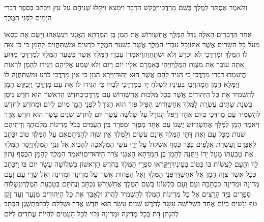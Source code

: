 \documentclass[../main/main.tex]{subfiles}
\begin{document}
\begin{multicols*}{\ncols}
וַתֹּאמֶר אֶסְתֵּר לַמֶּלֶךְ בְּשֵׁם מָרְדֳּכָי\PreVerseSpace{}וַיְבֻקַּשׁ הַדָּבָר וַיִּמָּצֵא וַיִּתָּלוּ שְׁנֵיהֶם עַל עֵץ וַיִּכָּתֵב בְּסֵפֶר דִּבְרֵי הַיָּמִים לִפְנֵי הַמֶּלֶךְ\OpenSection{}\par
{}אַחַר הַדְּבָרִים הָאֵלֶּה גִּדַּל הַמֶּלֶךְ אֲחַשְׁוֵרוֹשׁ אֶת הָמָן בֶּן הַמְּדָתָא הָאֲגָגִי וַיְנַשְּׂאֵהוּ וַיָּשֶׂם אֶת כִּסְאוֹ מֵעַל כָּל הַשָּׂרִים אֲשֶׁר אִתּוֹ\PreVerseSpace{}וְכָל עַבְדֵי הַמֶּלֶךְ אֲשֶׁר בְּשַׁעַר הַמֶּלֶךְ כֹּרְעִים וּמִשְׁתַּחֲוִים לְהָמָן כִּי כֵן צִוָּה לוֹ הַמֶּלֶךְ וּמָרְדֳּכַי לֹא יִכְרַע וְלֹא יִשְׁתַּחֲוֶה\PreVerseSpace{}וַיֹּאמְרוּ עַבְדֵי הַמֶּלֶךְ אֲשֶׁר בְּשַׁעַר הַמֶּלֶךְ לְמָרְדֳּכָי מַדּוּעַ אַתָּה עוֹבֵר אֵת מִצְוַת הַמֶּלֶךְ\PreVerseSpace{}וַיְהִי בְּאָמְרָם אֵלָיו יוֹם וָיוֹם וְלֹא שָׁמַע אֲלֵיהֶם וַיַּגִּידוּ לְהָמָן לִרְאוֹת הֲיַעַמְדוּ דִּבְרֵי מָרְדֳּכַי כִּי הִגִּיד לָהֶם אֲשֶׁר הוּא יְהוּדִי\PreVerseSpace{}וַיַּרְא הָמָן כִּי אֵין מָרְדֳּכַי כֹּרֵעַ וּמִשְׁתַּחֲוֶה לוֹ וַיִּמָּלֵא הָמָן חֵמָה\PreVerseSpace{}וַיִּבֶז בְּעֵינָיו לִשְׁלֹחַ יָד בְּמָרְדֳּכַי לְבַדּוֹ כִּי הִגִּידוּ לוֹ אֶת עַם מָרְדֳּכָי וַיְבַקֵּשׁ הָמָן לְהַשְׁמִיד אֶת כָּל הַיְּהוּדִים אֲשֶׁר בְּכָל מַלְכוּת אֲחַשְׁוֵרוֹשׁ עַם מָרְדֳּכָי\PreVerseSpace{}בַּחֹדֶשׁ הָרִאשׁוֹן הוּא חֹדֶשׁ נִיסָן בִּשְׁנַת שְׁתֵּים עֶשְׂרֵה לַמֶּלֶךְ אֲחַשְׁוֵרוֹשׁ הִפִּיל פּוּר הוּא הַגּוֹרָל לִפְנֵי הָמָן מִיּוֹם לְיוֹם וּמֵחֹדֶשׁ לְחֹדֶשׁ לְהַשְׁמִיד עַם מָרְדֳּכַי בְּיוֹם אֶחָד וַיִּפֹּל הַגּוֹרָל עַל שְׁלֹשָׁה עָשָׂר יוֹם לְחֹדֶשׁ\OmitEnd{} שְׁנֵים עָשָׂר הוּא חֹדֶשׁ אֲדָר \ClosedSection{}וַיֹּאמֶר הָמָן לַמֶּלֶךְ אֲחַשְׁוֵרוֹשׁ יֶשְׁנוֹ עַם אֶחָד מְפֻזָּר וּמְפֹרָד בֵּין הָעַמִּים בְּכֹל מְדִינוֹת מַלְכוּתֶךָ וְדָתֵיהֶם שֹׁנוֹת מִכָּל עָם וְאֶת דָּתֵי הַמֶּלֶךְ אֵינָם עֹשִׂים וְלַמֶּלֶךְ אֵין שֹׁוֶה לְהַנִּיחָם\PreVerseSpace{}אִם עַל הַמֶּלֶךְ טוֹב יִכָּתֵב לְאַבְּדָם וַעֲשֶׂרֶת אֲלָפִים כִּכַּר כֶּסֶף אֶשְׁקוֹל עַל יְדֵי עֹשֵׂי הַמְּלָאכָה לְהָבִיא אֶל גִּנְזֵי הַמֶּלֶךְ\PreVerseSpace{}וַיָּסַר הַמֶּלֶךְ אֶת טַבַּעְתּוֹ מֵעַל יָדוֹ וַיִּתְּנָהּ לְהָמָן בֶּן הַמְּדָתָא הָאֲגָגִי צֹרֵר הַיְּהוּדִים\PreVerseSpace{}וַיֹּאמֶר הַמֶּלֶךְ לְהָמָן הַכֶּסֶף נָתוּן לָךְ וְהָעָם לַעֲשׂוֹת בּוֹ כַּטּוֹב בְּעֵינֶיךָ\PreVerseSpace{}וַיִּקָּרְאוּ סֹפְרֵי הַמֶּלֶךְ בַּחֹדֶשׁ הָרִאשׁוֹן בִּשְׁלוֹשָׁה עָשָׂר יוֹם בּוֹ וַיִּכָּתֵב כְּכָל אֲשֶׁר צִוָּה הָמָן אֶל אֲחַשְׁדַּרְפְּנֵי הַמֶּלֶךְ וְאֶל הַפַּחוֹת אֲשֶׁר עַל מְדִינָה וּמְדִינָה וְאֶל שָׂרֵי עַם וָעָם מְדִינָה וּמְדִינָה כִּכְתָבָהּ וְעַם וָעָם כִּלְשׁוֹנוֹ בְּשֵׁם הַמֶּלֶךְ אֲחַשְׁוֵרֹשׁ נִכְתָּב וְנֶחְתָּם בְּטַבַּעַת הַמֶּלֶךְ\PreVerseSpace{}וְנִשְׁלוֹחַ סְפָרִים בְּיַד הָרָצִים אֶל כָּל מְדִינוֹת הַמֶּלֶךְ לְהַשְׁמִיד לַהֲרֹג וּלְאַבֵּד אֶת כָּל הַיְּהוּדִים מִנַּעַר וְעַד זָקֵן טַף וְנָשִׁים בְּיוֹם אֶחָד בִּשְׁלוֹשָׁה עָשָׂר לְחֹדֶשׁ שְׁנֵים עָשָׂר הוּא חֹדֶשׁ אֲדָר וּשְׁלָלָם לָבוֹז\PreVerseSpace{}פַּתְשֶׁגֶן הַכְּתָב לְהִנָּתֵן דָּת בְּכָל מְדִינָה וּמְדִינָה גָּלוּי לְכָל הָעַמִּים לִהְיוֹת עֲתִדִים לַיּוֹם 
\end{multicols*}
\end{document}
